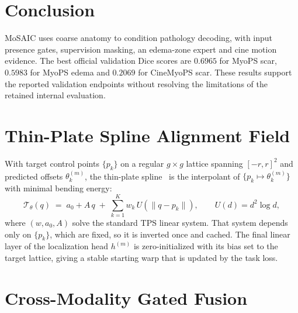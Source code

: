 \documentclass[runningheads]{llncs}
\begin{document}
\section{Conclusion}

MoSAIC uses coarse anatomy to condition pathology decoding, with input
presence gates, supervision masking, an edema-zone expert and cine motion
evidence. The best official validation Dice scores are
$0.6965$ for MyoPS scar, $0.5983$ for MyoPS edema and $0.2069$ for CineMyoPS
scar. These results support the reported validation endpoints without resolving
the limitations of the retained internal evaluation.




\appendix

\section{Thin-Plate Spline Alignment Field}
\label{app:tps}

With target control points $\{p_k\}$ on a regular $g\times g$ lattice spanning
$[-r,r]^2$ and predicted offsets $\theta^{(m)}_k$, the thin-plate
spline~\cite{bookstein1989principal} is the interpolant of
$\{p_k\mapsto\theta^{(m)}_k\}$ with minimal bending energy:
\begin{equation}
\mathcal{T}_{\theta}(q) \;=\; a_0 + A\,q \;+\; \sum_{k=1}^{K} w_k\,U\!\left(\lVert q-p_k\rVert\right),
\qquad U(d)=d^2\log d ,
\end{equation}
where $(w,a_0,A)$ solve the standard TPS linear system. That system depends only
on $\{p_k\}$, which are fixed, so it is inverted once and cached. The final
linear layer of the localization head $h^{(m)}$ is zero-initialized with its bias
set to the target lattice, giving a stable starting warp that is updated by the
task loss.

\section{Cross-Modality Gated Fusion}
\label{app:fusion}
\end{document}
